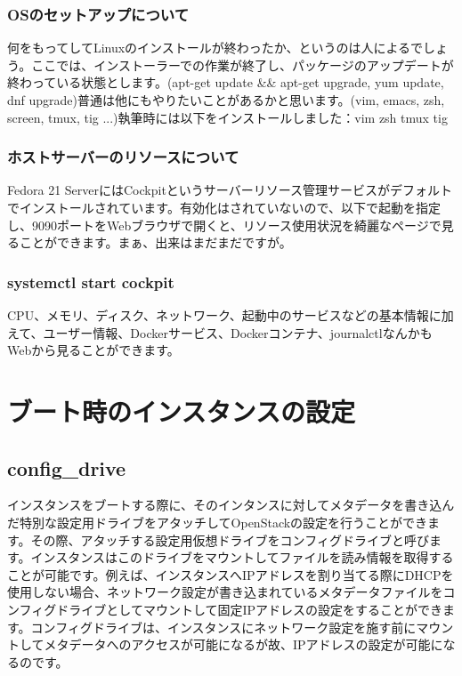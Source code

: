 \documentclass[9pt,b5paper,tombo,openany]{jsbook}
\begin{document}
\subsubsection{OSのセットアップについて}

何をもってしてLinuxのインストールが終わったか、というのは人によるでしょう。ここでは、インストーラーでの作業が終了し、パッケージのアップデートが終わっている状態とします。(apt-get update \&\& apt-get upgrade, yum update, dnf upgrade)普通は他にもやりたいことがあるかと思います。(vim, emacs, zsh, screen, tmux, tig ...)執筆時には以下をインストールしました：vim zsh tmux tig

\subsubsection{ホストサーバーのリソースについて}

Fedora 21 ServerにはCockpitというサーバーリソース管理サービスがデフォルトでインストールされています。有効化はされていないので、以下で起動を指定し、9090ポートをWebブラウザで開くと、リソース使用状況を綺麗なページで見ることができます。まぁ、出来はまだまだですが。

\subsubsection{systemctl start cockpit}

CPU、メモリ、ディスク、ネットワーク、起動中のサービスなどの基本情報に加えて、ユーザー情報、Dockerサービス、Dockerコンテナ、journalctlなんかもWebから見ることができます。

\section{ブート時のインスタンスの設定}

\subsection{config\_drive}

インスタンスをブートする際に、そのインタンスに対してメタデータを書き込んだ特別な設定用ドライブをアタッチしてOpenStackの設定を行うことができます。その際、アタッチする設定用仮想ドライブをコンフィグドライブと呼びます。インスタンスはこのドライブをマウントしてファイルを読み情報を取得することが可能です。例えば、インスタンスへIPアドレスを割り当てる際にDHCPを使用しない場合、ネットワーク設定が書き込まれているメタデータファイルをコンフィグドライブとしてマウントして固定IPアドレスの設定をすることができます。コンフィグドライブは、インスタンスにネットワーク設定を施す前にマウントしてメタデータへのアクセスが可能になるが故、IPアドレスの設定が可能になるのです。
\end{document}
